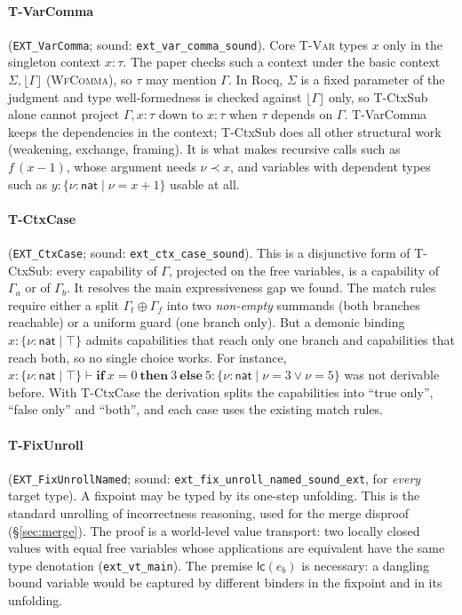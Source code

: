 \documentclass[10pt]{article}
\newcommand{\ov}[2]{\{\nu{:}#1 \mid #2\}}          %
\newcommand{\Nat}{\mathsf{nat}}
\newcommand{\Sum}{\oplus}
\newcommand{\entc}{\mathrel{,}}
\newcommand{\kw}[1]{\ensuremath{\mathbf{#1}}}
\newcommand{\rocq}[1]{\texttt{#1}}
\newcommand{\RN}[1]{\textsc{#1}}
\begin{document}
\paragraph{T-VarComma} (\rocq{EXT\_VarComma}; sound: \rocq{ext\_var\_comma\_sound}).
Core \RN{T-Var} types $x$ only in the singleton context $x{:}\tau$. The paper
checks such a context under the basic context $\Sigma,\lfloor\Gamma\rfloor$
(\textsc{WfComma}), so $\tau$ may mention $\Gamma$. In Rocq, $\Sigma$ is a
fixed parameter of the judgment and type well-formedness is checked against
$\lfloor\Gamma\rfloor$ only, so T-CtxSub alone cannot project
$\Gamma\entc x{:}\tau$ down to $x{:}\tau$ when $\tau$ depends on $\Gamma$.
T-VarComma keeps the dependencies in the context; T-CtxSub does all other
structural work (weakening, exchange, framing). It is what makes recursive
calls such as $f\,(x-1)$, whose argument needs $\nu\prec x$, and variables with
dependent types such as $y{:}\ov{\Nat}{\nu=x+1}$ usable at all.

\paragraph{T-CtxCase} (\rocq{EXT\_CtxCase}; sound: \rocq{ext\_ctx\_case\_sound}).
This is a disjunctive form of T-CtxSub: every capability of $\Gamma$, projected
on the free variables, is a capability of $\Gamma_a$ or of $\Gamma_b$. It
resolves the main expressiveness gap we found. The match rules require either
a split $\Gamma_t\Sum\Gamma_f$ into two \emph{non-empty} summands (both
branches reachable) or a uniform guard (one branch only). But a demonic
binding $x{:}\ov{\Nat}{\top}$ admits capabilities that reach only one branch
and capabilities that reach both, so no single choice works. For instance,
$x{:}\ov{\Nat}{\top}\vdash \kw{if}\ x{=}0\ \kw{then}\ 3\ \kw{else}\ 5 : \ov{\Nat}{\nu{=}3\vee\nu{=}5}$
was not derivable before. With T-CtxCase the derivation splits the
capabilities into ``true only'', ``false only'' and ``both'', and each case
uses the existing match rules.

\paragraph{T-FixUnroll} (\rocq{EXT\_FixUnrollNamed}; sound:
\rocq{ext\_fix\_unroll\_named\_sound\_ext}, for \emph{every} target type). A
fixpoint may be typed by its one-step unfolding. This is the standard
unrolling of incorrectness reasoning, used for the merge disproof
(\S\ref{sec:merge}). The proof is a world-level value transport: two
locally closed values with equal free variables whose applications are
equivalent have the same type denotation (\rocq{ext\_vt\_main}). The premise
$\mathsf{lc}(e_b)$ is necessary: a dangling bound variable would be captured
by different binders in the fixpoint and in its unfolding.
\end{document}

